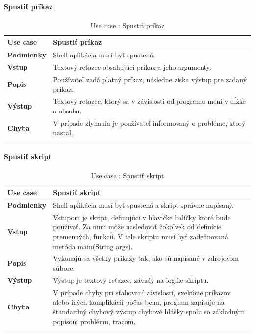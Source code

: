 \paragraph{Spustiť príkaz}
\begin{center}
	\begin{longtable}{|p{2.5cm}|p{12.2cm}|}
		\hline
		\textbf{Use case} & Spustiť príkaz \\ 
		\hline
		\textbf{Podmienky} & Shell aplikácia musí byť spustená. \\ 
		\hline
		\textbf{Vstup} & Textový reťazec obsahujúci príkaz a jeho argumenty.\\
		\hline
		\textbf{Popis} & Používateľ zadá platný príkaz, následne získa výstup pre zadaný príkaz. \\ 
		\hline
		\textbf{Výstup} & Textový reťazec, ktorý sa v závislosti od programu mení v dĺžke a obsahu.\\
		\hline
		\textbf{Chyba} & V prípade zlyhania je používateľ informovaný o probléme, ktorý nastal.\\
		\hline
		\caption{Use case : Spustiť príkaz}
		\label{table:1}
	\end{longtable}
	
\end{center}
\paragraph{Spustiť skript}
\begin{center}
	\begin{longtable}{|p{2.5cm}|p{12.2cm}|}
		\hline
		\textbf{Use case} & Spustiť skript \\ 
		\hline
		\textbf{Podmienky} & Shell aplikácia musí byť spustená a skript správne napísaný.\\ 
		\hline
		\textbf{Vstup} & Vstupom je skript, definujúci v hlavičke balíčky ktoré bude používať. Za nimi môže nasledovať čokoľvek od definície premenných, funkcií. V tele skriptu musí byť zadefinovaná metóda main(String args).\\
		\hline
		\textbf{Popis} & Vykonajú sa všetky príkazy tak, ako sú napísané v zdrojovom súbore. \\ 
		\hline
		\textbf{Výstup} & Výstup je textový reťazec, závislý na logike skriptu.\\
		\hline
		\textbf{Chyba} & V prípade chyby pri sťahovaní závislostí, exekúcie príkazov alebo iných komplikácií počas behu, program zapisuje na štandardný chybový výstup chybové hlášky spolu so základným popisom problému, tracom.\\
		\hline
		\caption{Use case : Spustiť skript}
		\label{table:1}
	\end{longtable}

\end{center}


